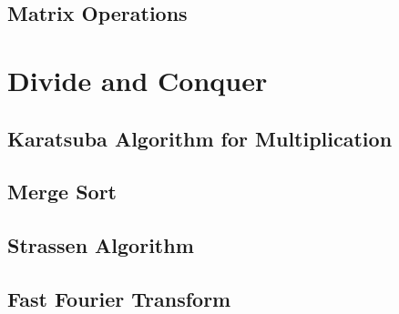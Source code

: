 \documentclass{article}
\begin{document}
  \subsection{Matrix Operations}

    \begin{definition}
      
    \end{definition}

    \begin{definition}
      
    \end{definition}

    \begin{definition}[QR Decomposition]
      
    \end{definition}

    \begin{definition}[LU Decomposition]
      
    \end{definition}

    \begin{definition}
      
    \end{definition}

\section{Divide and Conquer} 

  \begin{definition}
    
  \end{definition}

  \subsection{Karatsuba Algorithm for Multiplication}

  \subsection{Merge Sort}

  \subsection{Strassen Algorithm}

  \subsection{Fast Fourier Transform}
\end{document}
